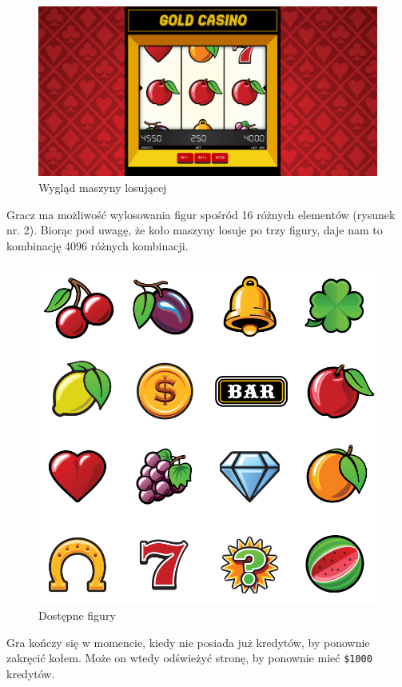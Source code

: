 \documentclass[a4paper,11pt,titlepage]{article}
\begin{document}
\begin{figure}[H]
\centering
\includegraphics[width=1\columnwidth]{img/screen.PNG}
\caption{Wygląd maszyny losującej} 
\end{figure}

Gracz ma możliwość wylosowania figur spośród 16 różnych elementów (rysunek nr. 2). Biorąc pod uwagę, że koło maszyny losuje po trzy figury, daje nam to kombinację 4096 różnych kombinacji.

\begin{figure}[H]
\centering
\includegraphics[width=1\columnwidth]{img/ikony.PNG}
\caption{Dostępne figury} 
\end{figure}

Gra kończy się w momencie, kiedy nie posiada już kredytów, by ponownie zakręcić kołem. Może on wtedy odświeżyć stronę, by ponownie mieć \verb|$1000| kredytów.
\end{document}
